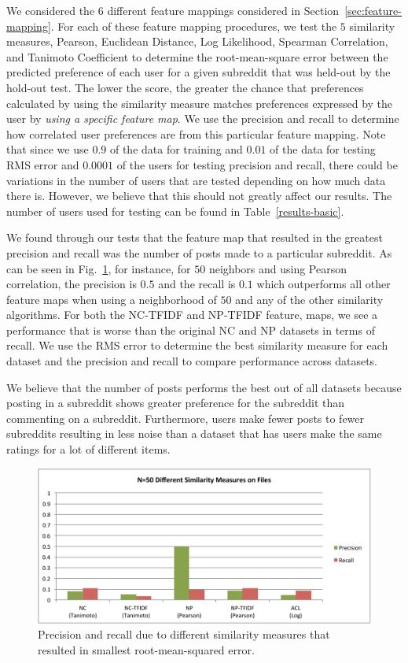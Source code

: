 \documentclass{article}
\begin{document}
We considered the $6$ different feature mappings considered in Section~\ref{sec:feature-mapping}. For each of these
feature mapping procedures, we test the $5$ similarity measures, Pearson, Euclidean Distance, Log Likelihood, 
Spearman Correlation, and Tanimoto Coefficient to determine the root-mean-square error between the predicted 
preference of each user for a given subreddit that was held-out by the hold-out test. The lower the score, the 
greater the chance that preferences calculated by using the similarity measure matches preferences expressed 
by the user by \emph{using a specific feature map}. We use the precision and recall to determine how correlated 
user preferences are from this particular feature mapping. Note that since we use $0.9$ of the data for training
and $0.01$ of the data for testing RMS error and $0.0001$ of the users for testing precision and recall, there
could be variations in the number of users that are tested depending on how much data there is. However,
we believe that this should not greatly affect our results. The number of users used for testing can be found in
Table~\ref{results-basic}.

We found through our tests that the feature map that resulted in the greatest precision and recall was the 
number of posts made to a particular subreddit. As can be seen in Fig.~\ref{fig:feature-map}, for instance,
for $50$ neighbors and using Pearson correlation, the precision is $0.5$ and the recall is $0.1$ which 
outperforms all other feature maps when using a neighborhood of $50$ and any of the other
similarity algorithms. For both the NC-TFIDF and NP-TFIDF feature, maps, we see  a performance
that is worse than the original NC and NP datasets in terms of recall. We use the RMS error to 
determine the best similarity measure for each dataset and the precision and recall to compare 
performance across datasets.

We believe that the number of posts performs the best out of all datasets because posting in a subreddit
shows greater preference for the subreddit than commenting on a subreddit. Furthermore, users
make fewer posts to fewer subreddits resulting in less noise than a dataset that has users
make the same ratings for a lot of different items. 

\begin{figure}[h]
\includegraphics[width=\textwidth]{img/sim-on-files.pdf}
\caption{Precision and recall due to different similarity measures that resulted in smallest
root-mean-squared error.}\label{fig:feature-map}
\end{figure} 
\end{document}
